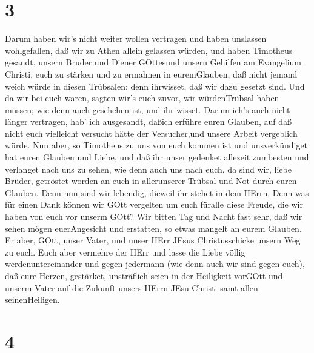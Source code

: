 \hypertarget{section-2}{%
\section{3}\label{section-2}}

 Darum haben wir's nicht weiter wollen vertragen und haben
unslassen wohlgefallen, daß wir zu Athen allein gelassen würden,
 und haben Timotheus gesandt, unsern Bruder und Diener
GOttesund unsern Gehilfen am Evangelium Christi, euch zu stärken und zu
ermahnen in euremGlauben,  daß nicht jemand weich würde in
diesen Trübsalen; denn ihrwisset, daß wir dazu gesetzt sind.
 Und da wir bei euch waren, sagten wir's euch zuvor, wir
würdenTrübsal haben müssen; wie denn auch geschehen ist, und ihr wisset.
 Darum ich's auch nicht länger vertragen, hab' ich
ausgesandt, daßich erführe euren Glauben, auf daß nicht euch vielleicht
versucht hätte der Versucher,und unsere Arbeit vergeblich würde.
 Nun aber, so Timotheus zu uns von euch kommen ist und
unsverkündiget hat euren Glauben und Liebe, und daß ihr unser gedenket
allezeit zumbesten und verlanget nach uns zu sehen, wie denn auch uns
nach euch,  da sind wir, liebe Brüder, getröstet worden an
euch in allerunserer Trübsal und Not durch euren Glauben. 
Denn nun sind wir lebendig, dieweil ihr stehet in dem HErrn.
 Denn was für einen Dank können wir GOtt vergelten um euch
füralle diese Freude, die wir haben von euch vor unserm GOtt?
 Wir bitten Tag und Nacht fast sehr, daß wir sehen mögen
euerAngesicht und erstatten, so etwas mangelt an eurem Glauben.
 Er aber, GOtt, unser Vater, und unser HErr JEsus
Christusschicke unsern Weg zu euch.  Euch aber vermehre der
HErr und lasse die Liebe völlig werdenuntereinander und gegen jedermann
(wie denn auch wir sind gegen euch),  daß eure Herzen,
gestärket, unsträflich seien in der Heiligkeit vorGOtt und unserm Vater
auf die Zukunft unsers HErrn JEsu Christi samt allen seinenHeiligen.

\hypertarget{section-3}{%
\section{4}\label{section-3}}

